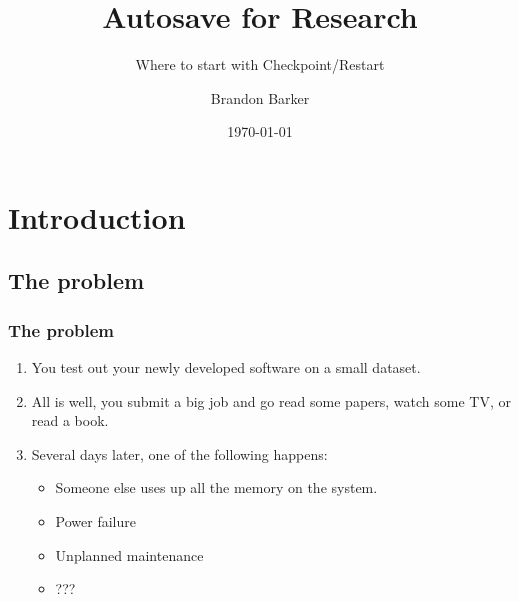 \documentclass[compress]{beamer}
\title{Autosave for Research}
\subtitle{Where to start with Checkpoint/Restart}
\author{Brandon Barker}
\institute{Center for Advanced Computing\\ Cornell University
\\ \vspace{.25cm}Bioinfo Practitioners Club}
\date{\today}
\begin{document}

\frame{
	\titlepage 
}



\section{Introduction}

\subsection{The problem}


\begin{frame}
\frametitle{The problem}

\begin{enumerate}
\item You test out your newly developed software on a small dataset.
\item All is well, you submit a big job and go read some papers, watch
  some TV, or read a book.
\item Several days later, one of the following happens:
  \begin{itemize}
  \item{Someone else uses up all the memory on the system.}
  \item{Power failure}
  \item{Unplanned maintenance}
  \item{???}
  \end{itemize}
\end{enumerate}
\end{frame}

\end{document}
